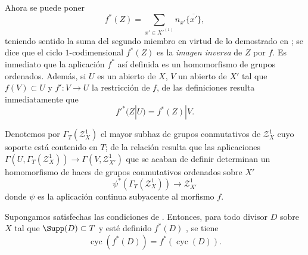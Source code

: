 \begin{env}[21.10.3]
\label{IV.21.10.3}
Ahora se puede poner
\[
  f^*(Z)=\sum_{x'\in X'^{(1)}}n_{x'}\overline{\{x'\}},
\]
teniendo sentido la suma del segundo miembro en virtud de lo demostrado en ;
se dice que el ciclo $1$-codimensional $f^*(Z)$ es la \emph{imagen inversa} de $Z$ por $f$.
Es inmediato que la aplicación $f^*$ así definida es un homomorfismo de grupos ordenados.
Además, si $U$ es un abierto de $X$, $V$ un abierto de $X'$ tal que $f(V)\subset U$ y $f':V\to U$ la restricción de $f$, de las definiciones resulta inmediatamente que
\[
\label{IV.21.10.3.1}
  f'^*(Z|U)=f^*(Z)|V.
  \tag{21.10.3.1}
\]

Denotemos por $\varGamma_T(\mathscr{Z}^1_X)$ el mayor subhaz de grupos conmutativos de $\mathscr{Z}^1_X$ cuyo soporte está contenido en $T$;
de la relación  resulta que las aplicaciones $\Gamma(U,\varGamma_T(\mathscr{Z}^1_X))\to\Gamma(V,\mathscr{Z}^1_{X'})$ que se acaban de definir determinan un homomorfismo de haces de grupos conmutativos ordenados sobre $X'$
\[
  \psi^*(\varGamma_T(\mathscr{Z}^1_X))\to\mathscr{Z}^1_{X'}
\]
donde $\psi$ es la aplicación continua subyacente al morfismo $f$.
\end{env}

\begin{proposition}[21.10.4]
\label{IV.21.10.4}
Supongamos satisfechas las condiciones de .
Entonces, para todo divisor $D$ sobre $X$ tal que $\Supp(D)\subset T$ y esté definido $f^*(D)$ , se tiene
\[
\label{IV.21.10.4.1}
  \operatorname{cyc}(f^*(D))=f^*(\operatorname{cyc}(D)).
  \tag{21.10.4.1}
\]
\end{proposition}

